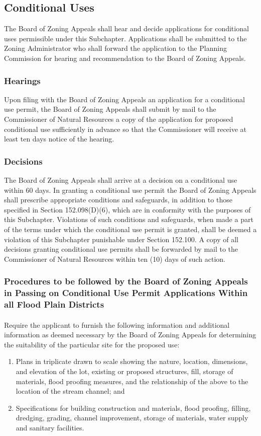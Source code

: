 \subsection{Conditional Uses}
The Board of Zoning Appeals shall hear and decide applications for conditional uses permissible under this Subchapter. Applications shall be submitted to the Zoning Administrator who shall forward the application to the Planning Commission for hearing and recommendation to the Board of Zoning Appeals.
\subsubsection{Hearings}
Upon filing with the Board of Zoning Appeals an application for a conditional use permit, the Board of Zoning Appeals shall submit by mail to the Commissioner of Natural Resources a copy of the application for proposed conditional use sufficiently in advance so that the Commissioner will receive at least ten days notice of the hearing.
\subsubsection{Decisions}
The Board of Zoning Appeals shall arrive at a decision on a conditional use within 60 days. In granting a conditional use permit the Board of Zoning Appeals shall prescribe appropriate conditions and safeguards, in addition to those specified in Section 152.098(D)(6), which are in conformity with the purposes of this Subchapter. Violations of such conditions and safeguards, when made a part of the terms under which the conditional use permit is granted, shall be deemed a violation of this Subchapter punishable under Section 152.100. A copy of all decisions granting conditional use permits shall be forwarded by mail to the Commissioner of Natural Resources within ten (10) days of such action.
\subsubsection{Procedures to be followed by the Board of Zoning Appeals in Passing on Conditional Use Permit Applications Within all Flood Plain Districts}
\paragraph{}
Require the applicant to furnish the following information and additional information as deemed necessary by the Board of Zoning Appeals for determining the suitability of the particular site for the proposed use:
\begin{enumerate}[{\indent}1)]
    \item Plans in triplicate drawn to scale showing the nature, location, dimensions, and elevation of the lot, existing or proposed structures, fill, storage of materials, flood proofing measures, and the relationship of the above to the location of the stream channel; and
    \item Specifications for building construction and materials, flood proofing, filling, dredging, grading, channel improvement, storage of materials, water supply and sanitary facilities.
\end{enumerate}
